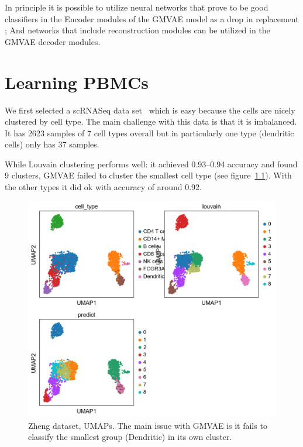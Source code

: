\documentclass[11pt, a4paper]{report}
\theoremstyle{plain}
\theoremstyle{definition}
\theoremstyle{remark}
\begin{document}
In principle it is possible to utilize neural networks that prove to be good
classifiers in the Encoder modules of the GMVAE model as a drop in replacement
; And networks that include reconstruction modules can be utilized in the 
GMVAE decoder modules.

\chapter{Learning PBMCs}

We first selected a scRNASeq data set~\cite{zheng2017massively} which is easy
because the cells are nicely clustered by cell type.
The main challenge with this data is that it is imbalanced. It has 2623 samples
of 7 cell types overall but in particularly one type (dendritic cells) only has 37 samples.

While Louvain clustering performs well: it achieved 0.93--0.94 accuracy and found 9
clusters, GMVAE failed to cluster the smallest cell type (see
figure~\ref{fig:zheng_ss_latent}). With the other types
it did ok with accuracy of around 0.92.

\begin{figure}[h]
\centering
\includegraphics[width=1.1\textwidth]{images/gmmvae_zheng_us_9c_umap.png}
\caption{Zheng dataset, UMAPs. The main issue with GMVAE is it fails to 
classify the smallest group (Dendritic) in its own cluster.}
\label{fig:zheng_ss_latent}
\end{figure}
\end{document}
